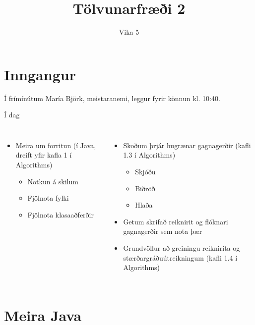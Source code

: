 \documentclass{beamer}
\title{Tölvunarfræði 2}
\subtitle{Vika 5}
\begin{document}
\begin{frame}
	\titlepage
\end{frame}

\section{Inngangur}

\begin{frame}{Í frímínútum}
	María Björk, meistaranemi, leggur fyrir könnun kl. 10:40.
\end{frame}

\begin{frame}{Í dag}
	\begin{columns}
		\begin{itemize}
			\item Meira um forritun (í Java, dreift yfir kafla 1 í Algorithms)
			      \begin{itemize}
				      \item Notkun á skilum 
				      \item Fjölnota fylki
				      \item Fjölnota klasaaðferðir
			      \end{itemize}
		\end{itemize}
		\begin{itemize}
			\item Skoðum þrjár hugrænar gagnagerðir (kafli 1.3 í Algorithms)
			      \begin{itemize}
				      \item Skjóðu 
				      \item Biðröð 
				      \item Hlaða 
			      \end{itemize}
			\item Getum skrifað reiknirit og flóknari gagnagerðir sem nota þær
			\item Grundvöllur að greiningu reiknirita og stærðargráðuútreikningum (kafli 1.4 í Algorithms)
		\end{itemize}
	\end{columns}
\end{frame}

\section{Meira Java}
\end{document}
